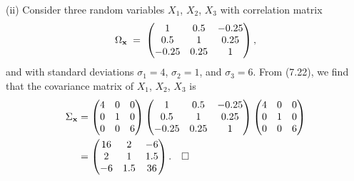 (ii) Consider three random variables $X_1$, $X_2$, $X_3$ with correlation matrix
\[
\Omega_{\mathbf{x}} \;=\; \begin{pmatrix} 1 & 0.5 & -0.25 \\ 0.5 & 1 & 0.25 \\ -0.25 & 0.25 & 1 \end{pmatrix},
\]
and with standard deviations $\sigma_1 = 4$, $\sigma_2 = 1$, and $\sigma_3 = 6$. From
(7.22), we find that the covariance matrix of $X_1$, $X_2$, $X_3$ is
\begin{align*}
\Sigma_{\mathbf{x}} &= \begin{pmatrix} 4 & 0 & 0 \\ 0 & 1 & 0 \\ 0 & 0 & 6 \end{pmatrix}
\begin{pmatrix} 1 & 0.5 & -0.25 \\ 0.5 & 1 & 0.25 \\ -0.25 & 0.25 & 1 \end{pmatrix}
\begin{pmatrix} 4 & 0 & 0 \\ 0 & 1 & 0 \\ 0 & 0 & 6 \end{pmatrix} \\
&= \begin{pmatrix} 16 & 2 & -6 \\ 2 & 1 & 1.5 \\ -6 & 1.5 & 36 \end{pmatrix}. \quad \square
\end{align*}
\par\medskip
